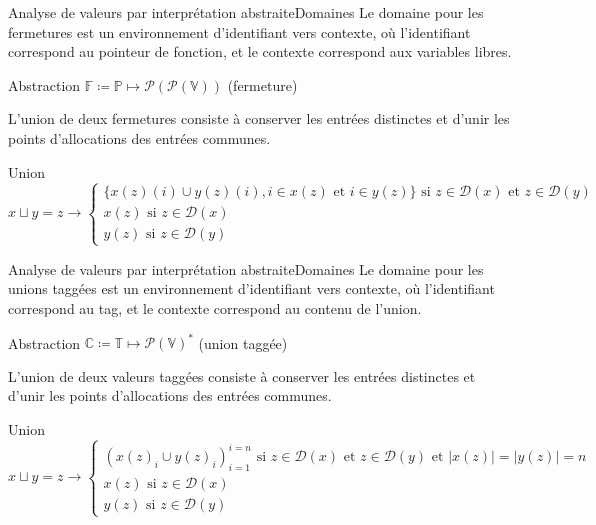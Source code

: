 \documentclass{beamer}
\begin{document}
\begin{frame}{Analyse de valeurs par interprétation abstraite}{Domaines}
    Le domaine pour les fermetures est un environnement d'identifiant vers contexte, où l'identifiant correspond au pointeur de fonction, et le contexte correspond aux variables libres.
    \begin{block}{Abstraction}
        $\mathbb{F} \coloneqq \mathbb{P} \mapsto \mathcal{P}(\mathcal{P}(\mathbb{V}))$ (fermeture)
    \end{block}

    L'union de deux fermetures consiste à conserver les entrées distinctes et d'unir les points d'allocations des entrées communes.%
    
    \begin{block}{Union}
        $$
        x \sqcup y = z \rightarrow
        \begin{cases}
            \lbrace x(z)(i) \cup y(z)(i), i \in x(z) \text{ et } i \in y(z) \rbrace \text{ si } z \in \mathcal{D}(x) \text{ et } z \in \mathcal{D}(y) \\
            x(z) \text{ si } z \in \mathcal{D}(x) \\
            y(z) \text{ si } z \in \mathcal{D}(y)
        \end{cases}
        $$
    \end{block}
\end{frame}

\begin{frame}{Analyse de valeurs par interprétation abstraite}{Domaines}
    Le domaine pour les unions taggées est un environnement d'identifiant vers contexte, où l'identifiant correspond au tag, et le contexte correspond au contenu de l'union.

    \begin{block}{Abstraction}
        $\mathbb{C} \coloneqq \mathbb{T} \mapsto \mathcal{P}(\mathbb{V})^{*}$ (union taggée)
    \end{block}

    L'union de deux valeurs taggées consiste à conserver les entrées distinctes et d'unir les points d'allocations des entrées communes.%
    
    \begin{block}{Union}
        $$
        x \sqcup y = z \rightarrow
        \begin{cases}
            \left( x(z)_i \cup y(z)_i \right)_{i=1}^{i=n} \text{ si } z \in \mathcal{D}(x) \text{ et } z \in \mathcal{D}(y) \text{ et } |x(z)| = |y(z)| = n \\
            x(z) \text{ si } z \in \mathcal{D}(x) \\
            y(z) \text{ si } z \in \mathcal{D}(y)
        \end{cases}
        $$
    \end{block}
\end{frame}
\end{document}
